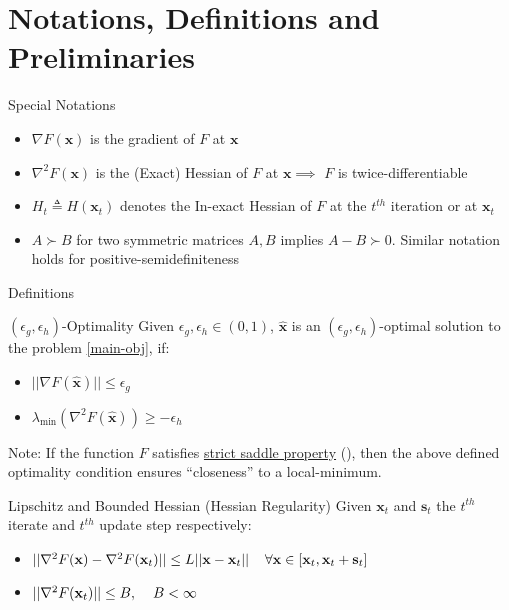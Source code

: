 \documentclass[10pt]{beamer}
\newcommand{\h}{\nabla^{2}}
\newcommand{\g}{\nabla}
\newcommand{\xbold}{\mathbf{x}}
\newcommand{\sbold}{\mathbf{s}}
\newcommand{\mineig}{\lambda_{\min}}
\newcommand{\eg}{\epsilon_{g}}
\newcommand{\eh}{\epsilon_{h}}
\begin{document}
\section{Notations, Definitions and Preliminaries}
\begin{frame}{Special Notations}
\begin{itemize}
\item<1->{\(\g F(\xbold)\) is the gradient of \(F\) at \(\xbold\)}
\item<2->{\(\h F(\xbold)\) is the (Exact) Hessian of \(F\) at \(\xbold \implies\) \(F\) is twice-differentiable}
\item<3->{\(H_{t} \triangleq H(\xbold_{t})\) denotes the In-exact Hessian of \(F\) at the \(t^{th}\) iteration or at \(\xbold_{t}\)}
\item<4->{\(A \succ B\) for two symmetric matrices \(A, B\) implies \(A - B \succ 0\). Similar notation holds for positive-semidefiniteness}
\end{itemize}
\end{frame}

\begin{frame}{Definitions}
\begin{alertblock}{\((\eg, \eh)\)-Optimality}
\label{sec-opt}
Given \(\eg, \eh \in (0, 1)\), \(\mathbf{\hat{x}}\) is an \((\eg, \eh)\)-optimal solution to the problem \ref{main-obj}, if:
\begin{itemize}
\item \(||\g F(\mathbf{\hat{x}}) || \leq \eg\)
\item \(\mineig (\h F(\mathbf{\hat{x}})) \geq -\eh\)
\end{itemize}
\end{alertblock}
\pause
Note: If the function \(F\) satisfies \underline{strict saddle property} (\cite{ge-colt}), then the above defined optimality condition ensures ``closeness'' to a local-minimum.
\pause
\begin{alertblock}{Lipschitz and Bounded Hessian (Hessian Regularity)}
Given \(\xbold_{t}\) and \(\sbold_{t}\) the \(t^{th}\) iterate and \(t^{th}\) update step respectively:
\begin{itemize}
\item \(||\h F(\xbold) - \h F(\xbold_{t})|| \leq L||\xbold - \xbold_{t}|| \hspace{4mm} \forall \xbold \in [\xbold_{t}, \xbold_{t} + \sbold_{t}]\)
\item \(||\h F(\xbold_{t}) || \leq B, \hspace{4mm} B < \infty\)
\end{itemize}
\end{alertblock}
\end{frame}
\end{document}
